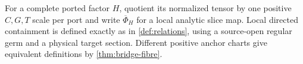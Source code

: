 For a complete ported factor \(H\), quotient its normalized tensor by one
positive \(C,G,T\) scale per port and write \(\overline\Phi_H\) for a local
analytic slice map.  Local directed containment is defined exactly as in
\cref{def:relations}, using a source-open regular germ and a physical target
section.  Different positive anchor charts give equivalent definitions by
\cref{thm:bridge-fibre}.
